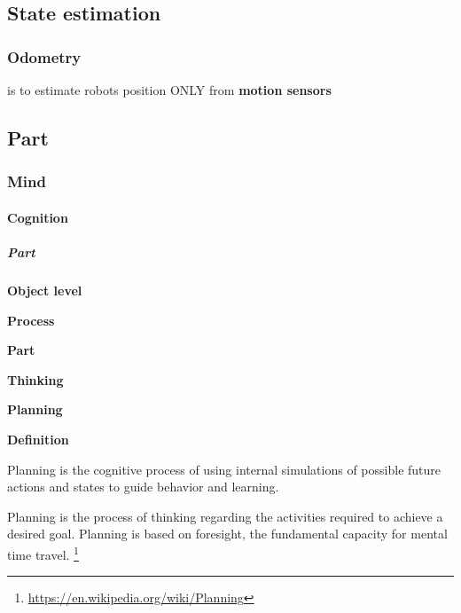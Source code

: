 \documentclass{book}
\providecommand{\ProjectDeepHeading}[2]{%
    \par\medskip\noindent\textbf{#2}\par\smallskip
}
\providecommand{\seeherefooter}[1]{\footnote{\url{#1}}}
\begin{document}
\subsection{State estimation}

\subsubsection{Odometry}
    is to estimate robots position ONLY from \textbf{motion sensors}

\subsection{Part}

\subsubsection{Mind}

\paragraph{Cognition}

\subparagraph{Part}

\ProjectDeepHeading{1}{Object level}

\ProjectDeepHeading{2}{Process}

\ProjectDeepHeading{3}{Part}

\ProjectDeepHeading{4}{Thinking}

\ProjectDeepHeading{5}{Planning}


\ProjectDeepHeading{8}{Definition}

   \cite{mattar-2026-planning-in-the-brain-its-not-what-you-think-it-is}
   Planning is the cognitive process of using internal simulations of possible future actions and states to guide behavior and learning.



   Planning is the process of thinking regarding the activities required to achieve a desired goal. Planning is based on foresight, the fundamental capacity for mental time travel. \seeherefooter{https://en.wikipedia.org/wiki/Planning}
\end{document}
